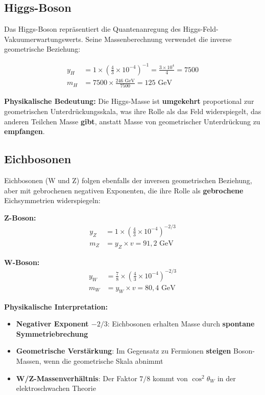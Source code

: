 \documentclass[12pt,a4paper]{article}
\begin{document}
	\subsection{Higgs-Boson}
	\label{subsec:higgs_boson}
	
	Das Higgs-Boson repräsentiert die Quantenanregung des Higgs-Feld-Vakuumerwartungswerts. Seine Massenberechnung verwendet die inverse geometrische Beziehung:
	
	\begin{align}
		y_H &= 1 \times \left(\frac{4}{3} \times 10^{-4}\right)^{-1} = \frac{3 \times 10^4}{4} = 7500 \\
		m_H &= 7500 \times \frac{246 \text{ GeV}}{7500} = 125 \text{ GeV}
	\end{align}
	
	\textbf{Physikalische Bedeutung:} Die Higgs-Masse ist \textbf{umgekehrt} proportional zur geometrischen Unterdrückungsskala, was ihre Rolle als das Feld widerspiegelt, das anderen Teilchen Masse \textbf{gibt}, anstatt Masse von geometrischer Unterdrückung zu \textbf{empfangen}.
	
	\subsection{Eichbosonen}
	\label{subsec:gauge_bosons}
	
	Eichbosonen (W und Z) folgen ebenfalls der inversen geometrischen Beziehung, aber mit gebrochenen negativen Exponenten, die ihre Rolle als \textbf{gebrochene} Eichsymmetrien widerspiegeln:
	
	\textbf{Z-Boson:}
	\begin{align}
		y_Z &= 1 \times \left(\frac{4}{3} \times 10^{-4}\right)^{-2/3} \\
		m_Z &= y_Z \times v = 91,2 \text{ GeV}
	\end{align}
	
	\textbf{W-Boson:}
	\begin{align}
		y_W &= \frac{7}{8} \times \left(\frac{4}{3} \times 10^{-4}\right)^{-2/3} \\
		m_W &= y_W \times v = 80,4 \text{ GeV}
	\end{align}
	
	\textbf{Physikalische Interpretation:}
	\begin{itemize}
		\item \textbf{Negativer Exponent $-2/3$}: Eichbosonen erhalten Masse durch \textbf{spontane Symmetriebrechung}
		\item \textbf{Geometrische Verstärkung}: Im Gegensatz zu Fermionen \textbf{steigen} Boson-Massen, wenn die geometrische Skala abnimmt
		\item \textbf{W/Z-Massenverhältnis}: Der Faktor $7/8$ kommt von $\cos^2\theta_W$ in der elektroschwachen Theorie
	\end{itemize}
	
\end{document}
